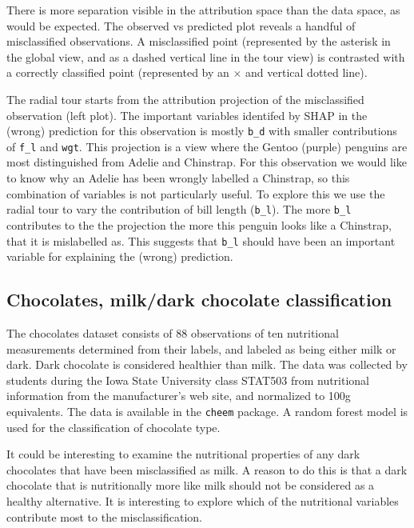 \documentclass[
]{article}
\begin{document}
There is more separation visible in the attribution space than the data space, as would be expected. The observed vs predicted plot reveals a handful of misclassified observations. A misclassified point (represented by the asterisk in the global view, and as a dashed vertical line in the tour view) is contrasted with a correctly classified point (represented by an \(\times\) and vertical dotted line).

The radial tour starts from the attribution projection of the misclassified observation (left plot). The important variables identifed by SHAP in the (wrong) prediction for this observation is mostly \texttt{b\_d} with smaller contributions of \texttt{f\_l} and \texttt{wgt}. This projection is a view where the Gentoo (purple) penguins are most distinguished from Adelie and Chinstrap. For this observation we would like to know why an Adelie has been wrongly labelled a Chinstrap, so this combination of variables is not particularly useful. To explore this we use the radial tour to vary the contribution of bill length (\texttt{b\_l}). The more \texttt{b\_l} contributes to the the projection the more this penguin looks like a Chinstrap, that it is mislabelled as. This suggests that \texttt{b\_l} should have been an important variable for explaining the (wrong) prediction.

\hypertarget{chocolates-milkdark-chocolate-classification}{%
\subsection{Chocolates, milk/dark chocolate classification}\label{chocolates-milkdark-chocolate-classification}}

The chocolates dataset consists of 88 observations of ten nutritional measurements determined from their labels, and labeled as being either milk or dark. Dark chocolate is considered healthier than milk. The data was collected by students during the Iowa State University class STAT503 from nutritional information from the manufacturer's web site, and normalized to 100g equivalents. The data is available in the \texttt{cheem} package. A random forest model is used for the classification of chocolate type.

It could be interesting to examine the nutritional properties of any dark chocolates that have been misclassified as milk. A reason to do this is that a dark chocolate that is nutritionally more like milk should not be considered as a healthy alternative. It is interesting to explore which of the nutritional variables contribute most to the misclassification.
\end{document}
